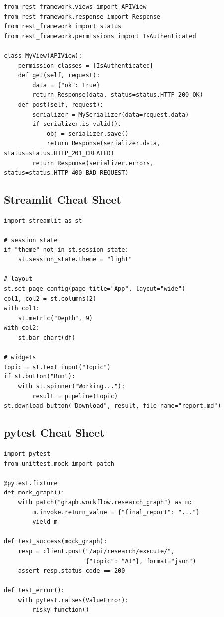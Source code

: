 \begin{codestorybox}
\begin{lstlisting}[style=pythonstyle, caption={DRF essentials}]
from rest_framework.views import APIView
from rest_framework.response import Response
from rest_framework import status
from rest_framework.permissions import IsAuthenticated

class MyView(APIView):
    permission_classes = [IsAuthenticated]
    def get(self, request):
        data = {"ok": True}
        return Response(data, status=status.HTTP_200_OK)
    def post(self, request):
        serializer = MySerializer(data=request.data)
        if serializer.is_valid():
            obj = serializer.save()
            return Response(serializer.data, status=status.HTTP_201_CREATED)
        return Response(serializer.errors, status=status.HTTP_400_BAD_REQUEST)
\end{lstlisting}
\end{codestorybox}

\subsection{Streamlit Cheat Sheet}

\begin{codestorybox}
\begin{lstlisting}[style=pythonstyle, caption={Streamlit essentials}]
import streamlit as st

# session state
if "theme" not in st.session_state:
    st.session_state.theme = "light"

# layout
st.set_page_config(page_title="App", layout="wide")
col1, col2 = st.columns(2)
with col1:
    st.metric("Depth", 9)
with col2:
    st.bar_chart(df)

# widgets
topic = st.text_input("Topic")
if st.button("Run"):
    with st.spinner("Working..."):
        result = pipeline(topic)
st.download_button("Download", result, file_name="report.md")
\end{lstlisting}
\end{codestorybox}

\subsection{pytest Cheat Sheet}

\begin{codestorybox}
\begin{lstlisting}[style=pythonstyle, caption={pytest essentials}]
import pytest
from unittest.mock import patch

@pytest.fixture
def mock_graph():
    with patch("graph.workflow.research_graph") as m:
        m.invoke.return_value = {"final_report": "..."}
        yield m

def test_success(mock_graph):
    resp = client.post("/api/research/execute/",
                       {"topic": "AI"}, format="json")
    assert resp.status_code == 200

def test_error():
    with pytest.raises(ValueError):
        risky_function()
\end{lstlisting}
\end{codestorybox}

